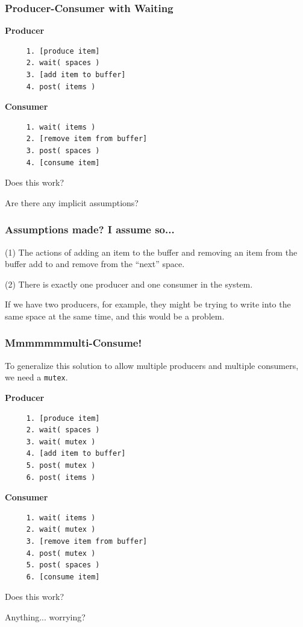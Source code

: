 \begin{frame}[fragile]
	\frametitle{Producer-Consumer with Waiting}

	\begin{multicols}{2}
		\textbf{Producer}
		\begin{verbatim}
	 1. [produce item]
	 2. wait( spaces )
	 3. [add item to buffer]
	 4. post( items )
  		\end{verbatim}
		\columnbreak
		\textbf{Consumer}\vspace{-2em}
		\begin{verbatim}
	 1. wait( items )
	 2. [remove item from buffer]
	 3. post( spaces )
	 4. [consume item]
  		\end{verbatim}
	\end{multicols}
	\vspace{-2em}

	Does this work?

	Are there any implicit assumptions?

\end{frame}

\begin{frame}
	\frametitle{Assumptions made? I assume so...}

	(1) The actions of adding an item to the buffer and removing an item from the buffer add to and remove from the ``next'' space.

	(2) There is exactly one producer and one consumer in the system.

	If we have two producers, for example, they might be trying to write into the same space at the same time, and this would be a problem.


\end{frame}


\begin{frame}[fragile]
	\frametitle{Mmmmmmmulti-Consume!}

	To generalize this solution to allow multiple producers and multiple consumers, we need a \texttt{mutex}.

	\begin{multicols}{2}
		\textbf{Producer}
		\begin{verbatim}
	 1. [produce item]
	 2. wait( spaces )
	 3. wait( mutex )
	 4. [add item to buffer]
	 5. post( mutex )
	 6. post( items )
  		\end{verbatim}
		\columnbreak
		\textbf{Consumer}\vspace{-2em}
		\begin{verbatim}
	 1. wait( items )
	 2. wait( mutex )
	 3. [remove item from buffer]
	 4. post( mutex )
	 5. post( spaces )
	 6. [consume item]
  		\end{verbatim}
	\end{multicols}
	\vspace{-2em}

	Does this work?

	Anything... worrying?

\end{frame}


